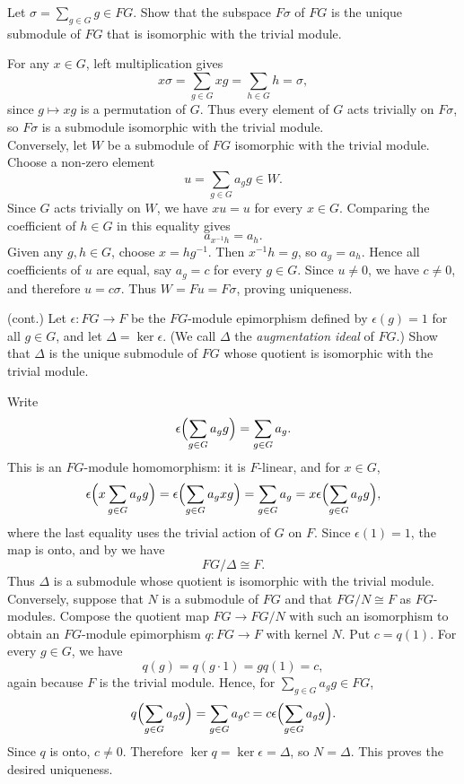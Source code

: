 \documentclass[../Odyssey_Project.tex]{subfiles}
\begin{document}
\begin{exercise}
\label{ex:12.2}
Let $\sigma = \sum_{g \in G} g \in FG$. Show that the subspace $F\sigma$ of $FG$ is the unique submodule of $FG$ that is isomorphic with the trivial module.
\end{exercise}
\begin{solution}
    For any $x \in G$, left multiplication gives
    \[
        x\sigma = \sum_{g \in G} xg = \sum_{h \in G} h = \sigma,
    \]
    since $g \mapsto xg$ is a permutation of $G$. Thus every element of $G$ acts trivially on $F\sigma$, so $F\sigma$ is a submodule isomorphic with the trivial module.\\
    Conversely, let $W$ be a submodule of $FG$ isomorphic with the trivial module. Choose a non-zero element
    \[
        u = \sum_{g \in G} a_g g \in W.
    \]
    Since $G$ acts trivially on $W$, we have $xu = u$ for every $x \in G$. Comparing the coefficient of $h \in G$ in this equality gives
    \[
        a_{x^{-1}h} = a_h.
    \]
    Given any $g,h \in G$, choose $x = hg^{-1}$. Then $x^{-1}h = g$, so $a_g = a_h$. Hence all coefficients of $u$ are equal, say $a_g = c$ for every $g \in G$. Since $u \neq 0$, we have $c \neq 0$, and therefore $u = c\sigma$. Thus $W = Fu = F\sigma$, proving uniqueness.
\end{solution}

\begin{exercise}
\label{ex:12.3}
(cont.) Let $\epsilon \colon FG \to F$ be the $FG$-module epimorphism defined by $\epsilon(g) = 1$ for all $g \in G$, and let $\Delta = \ker \epsilon$. (We call $\Delta$ the \emph{augmentation ideal} of $FG$.) Show that $\Delta$ is the unique submodule of $FG$ whose quotient is isomorphic with the trivial module.
\end{exercise}
\begin{solution}
    Write
    \[
        \epsilon\Bigl(\sum_{g \in G} a_g g\Bigr) = \sum_{g \in G} a_g.
    \]
    This is an $FG$-module homomorphism: it is $F$-linear, and for $x \in G$,
    \[
        \epsilon\Bigl(x\sum_{g \in G} a_g g\Bigr)
        = \epsilon\Bigl(\sum_{g \in G} a_g xg\Bigr)
        = \sum_{g \in G} a_g
        = x\epsilon\Bigl(\sum_{g \in G} a_g g\Bigr),
    \]
    where the last equality uses the trivial action of $G$ on $F$. Since $\epsilon(1)=1$, the map is onto, and by  we have
    \[
        FG/\Delta \cong F.
    \]
    Thus $\Delta$ is a submodule whose quotient is isomorphic with the trivial module.\\
    Conversely, suppose that $N$ is a submodule of $FG$ and that $FG/N \cong F$ as $FG$-modules. Compose the quotient map $FG \to FG/N$ with such an isomorphism to obtain an $FG$-module epimorphism $q \colon FG \to F$ with kernel $N$. Put $c = q(1)$. For every $g \in G$, we have
    \[
        q(g) = q(g \cdot 1) = gq(1) = c,
    \]
    again because $F$ is the trivial module. Hence, for $\sum_{g \in G} a_g g \in FG$,
    \[
        q\Bigl(\sum_{g \in G} a_g g\Bigr) = \sum_{g \in G} a_g c = c\epsilon\Bigl(\sum_{g \in G} a_g g\Bigr).
    \]
    Since $q$ is onto, $c \neq 0$. Therefore $\ker q = \ker \epsilon = \Delta$, so $N=\Delta$. This proves the desired uniqueness.
\end{solution}
\end{document}
